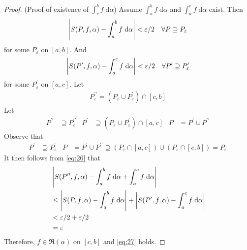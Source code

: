 \documentclass[thmcnt=section, 12pt]{my-elegantbook}
\begin{document}
\begin{proof}
    \par (Proof of existence of $\int_c^b f \; \mathrm{d}\alpha$) Assume $\int_a^b f \; \mathrm{d}\alpha$ and $\int_a^c f \; \mathrm{d}\alpha$ exist. Then 
    \begin{align*}
        \left\lvert S(P, f, \alpha) - \int_a^b f \; \mathrm{d}\alpha \right\rvert < \varepsilon / 2
        \quad \forall P \supseteq P_\varepsilon
    \end{align*}
    for some $P_\varepsilon$ on $[a, b]$. And
    \begin{align*}
        \left\lvert S(P^\prime, f, \alpha) - \int_a^c f \; \mathrm{d}\alpha \right\rvert < \varepsilon / 2
        \quad \forall P^\prime \supseteq P_\varepsilon^\prime
    \end{align*}
    for some $P_\varepsilon^\prime$ on $[a, c]$.
    Let
    \begin{align*}
        P_\varepsilon^{\prime\prime} = (P_\varepsilon \cup P_\varepsilon^\prime) \cap [c, b]
    \end{align*}
    Let
    \begin{align*}
        P^{\prime\prime} &\supseteq P_\varepsilon^{\prime\prime} &
        P^\prime &\supseteq (P_\varepsilon \cup P_\varepsilon^\prime) \cap [a, c] &
        P &= P^\prime \cup P^{\prime\prime}
    \end{align*} 
    Observe that 
    \begin{align*}
        P^\prime &\supseteq P_\varepsilon^\prime &
        P &= P^\prime \cup P^{\prime\prime}
        \supseteq (P_\varepsilon \cap [a, c]) \cup (P_\varepsilon \cap [c, b])
        = P_\varepsilon
    \end{align*}
    It then follows from \eqref{eq:26} that
    \begin{align*}
        &\left\lvert 
            S(P^{\prime\prime}, f, \alpha)
            - \int_a^b f \; \mathrm{d}\alpha
            + \int_a^c f \; \mathrm{d}\alpha 
         \right\rvert \\ 
        &\leq \left\lvert 
            S(P, f, \alpha)
            - \int_a^b f \; \mathrm{d}\alpha
         \right\rvert + \left\lvert 
            S(P^\prime, f, \alpha)
            - \int_a^c f \; \mathrm{d}\alpha
         \right\rvert \\ 
        &< \varepsilon / 2 + \varepsilon / 2 \\ 
        &= \varepsilon
    \end{align*} 
    Therefore, $f \in \mathfrak{R}(\alpha)$ on $[c, b]$ and \eqref{eq:27} holds.




\end{proof}
\end{document}
